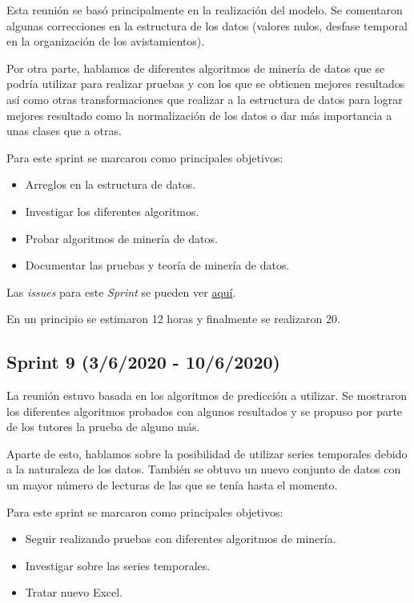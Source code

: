 Esta reunión se basó principalmente en la realización del modelo. Se comentaron algunas correcciones en la estructura de los datos (valores nulos, desfase temporal en la organización de los avistamientos).

Por otra parte, hablamos de diferentes algoritmos de minería de datos que se podría utilizar para realizar pruebas y con los que se obtienen mejores resultados así como otras transformaciones que realizar a la estructura de datos para lograr mejores resultado como la normalización de los datos o dar más importancia a unas clases que a otras.

Para este sprint se marcaron como principales objetivos:
\begin{itemize}
	\item Arreglos en la estructura de datos.
	\item Investigar los diferentes algoritmos.
	\item Probar algoritmos de minería de datos.
	\item Documentar las pruebas y teoría de minería de datos.
\end{itemize} 

Las \emph{issues} para este \emph{Sprint} se pueden ver \href{https://github.com/psnti/TFG-Pablo-Santidrian-Tudanca/milestone/8}{aquí}.


En un principio se estimaron 12 horas y finalmente se realizaron 20.

\subsection{Sprint 9 (3/6/2020 - 10/6/2020)}\label{Sprint-9}
La reunión estuvo basada en los algoritmos de predicción a utilizar. Se mostraron los diferentes algoritmos probados con algunos resultados y se propuso por parte de los tutores la prueba de alguno más.

Aparte de esto, hablamos sobre la posibilidad de utilizar series temporales debido a la naturaleza de los datos. También se obtuvo un nuevo conjunto de datos con un mayor número de lecturas de las que se tenía hasta el momento.


Para este sprint se marcaron como principales objetivos:
\begin{itemize}
	\item Seguir realizando pruebas con diferentes algoritmos de minería.
	\item Investigar sobre las series temporales.
	\item Tratar nuevo Excel.
\end{itemize} 

